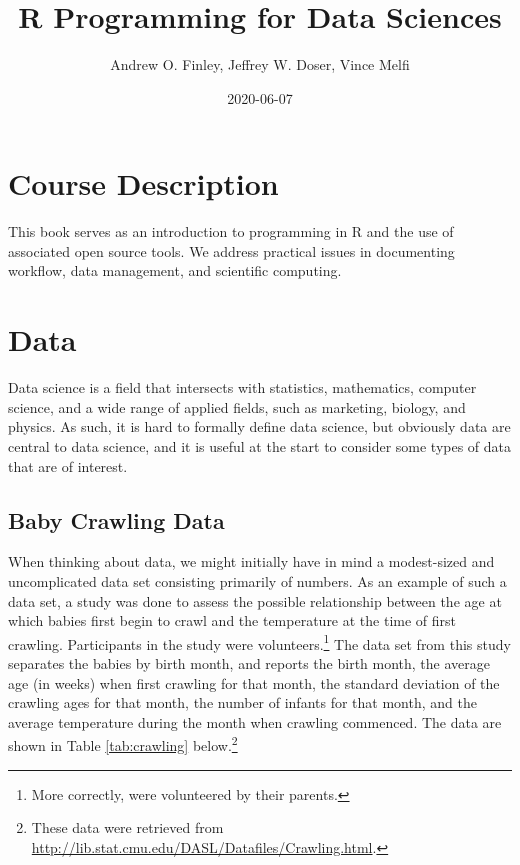 \documentclass[
]{krantz}
\title{R Programming for Data Sciences}
\author{Andrew O. Finley, Jeffrey W. Doser, Vince Melfi}
\date{2020-06-07}
\begin{document}
\maketitle


\thispagestyle{empty}

\setlength{\abovedisplayskip}{-5pt}
\setlength{\abovedisplayshortskip}{-5pt}

{
\hypersetup{linkcolor=}
\setcounter{tocdepth}{2}
\tableofcontents
}
\listoftables
\listoffigures
\hypertarget{course-description}{%
\chapter*{Course Description}\label{course-description}}


This book serves as an introduction to programming in R and the use of associated open source tools. We address practical issues in documenting workflow, data management, and scientific computing.

\mainmatter

\hypertarget{data}{%
\chapter{Data}\label{data}}

Data science is a field that intersects with statistics, mathematics, computer science, and a wide range of applied fields, such as marketing, biology, and physics. As such, it is hard to formally define data science, but obviously data are central to data science, and it is useful at the start to consider some types of data that are of interest.

\hypertarget{baby-crawling-data}{%
\section{Baby Crawling Data}\label{baby-crawling-data}}

When thinking about data, we might initially have in mind a modest-sized and uncomplicated data set consisting primarily of numbers. As an example of such a data set, a study was done to assess the possible relationship between the age at which babies first begin to crawl and the temperature at the time of first crawling. Participants in the study were volunteers.\footnote{More correctly, were volunteered by their parents.} The data set from this study separates the babies by birth month, and reports the birth month, the average age (in weeks) when first crawling for that month, the standard deviation of the crawling ages for that month, the number of infants for that month, and the average temperature during the month when crawling commenced. The data are shown in Table \ref{tab:crawling} below.\footnote{These data were retrieved from \url{http://lib.stat.cmu.edu/DASL/Datafiles/Crawling.html}.}
\end{document}

